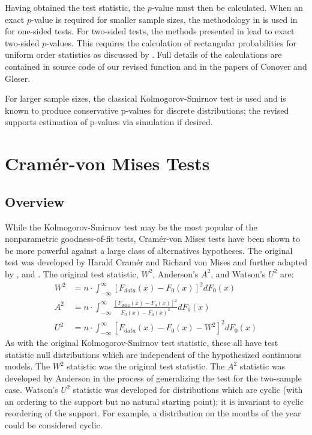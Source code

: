 Having obtained the test statistic, the $p$-value must then be calculated. 
When an exact $p$-value is required for
smaller sample sizes, the methodology in \citet{Conover1972} is used in
for one-sided tests.  For two-sided tests, the methods presented in
\citet{gleser85} lead to exact two-sided $p$-values.  This requires the
calculation of rectangular probabilities for uniform order statistics
as discussed by \citet{nieder81}.
Full details of the calculations are contained in source code
of our revised function  and in the papers of
Conover and Gleser.  

For larger sample sizes, the classical Kolmogorov-Smirnov test is used
and is known to produce conservative p-values for discrete distributions;
the revised  supports estimation
of p-values via simulation if desired.


\section{Cram\'{e}r-von Mises Tests}

\subsection{Overview}

While the Kolmogorov-Smirnov test may be the most popular of
the nonparametric goodness-of-fit tests, Cram\'{e}r-von Mises
tests have been shown to be more powerful against a large class
of alternatives hypotheses. 
The original test was developed by
Harald Cram\'{e}r and Richard von Mises \citep{cramer1928, vonmises1928} 
and further adapted by \cite{anderson1952}, and  \cite{Watson1961}. 
The original test statistic, $W^2$, Anderson's $A^2$, and Watson's
$U^2$ are:
\begin{align}
W^2 &= n \cdot \int_{-\infty}^{\infty} \left[ F_{data}(x)- F_{0}(x) \right]^2 dF_0(x) \label{W2} \\
A^2 &= n \cdot \int_{-\infty}^{\infty} \frac{\left[F_{data}(x)- F_{0}(x) \right]^2}{F_0(x) -F_0(x)^2} dF_0(x) \label{A2} \\
U^2 &= n \cdot \int_{-\infty}^{\infty} \left[ F_{data}(x)- F_{0}(x) - W^2 \right]^2 dF_0(x) \label{U2}
\end{align}
As with the original Kolmogorov-Smirnov test statistic, these all have 
test statistic null distributions which are independent of the
hypothesized continuous models.
The $W^2$ statistic was the original test statistic.
The $A^2$ statistic was developed by
Anderson in the process of generalizing the test for the two-sample case.
Watson's $U^2$ statistic was developed for distributions
which are cyclic (with an ordering to the support but
no natural starting point); it is invariant to cyclic reordering of
the support.   For example, a distribution on the months of the year
could be considered cyclic.


